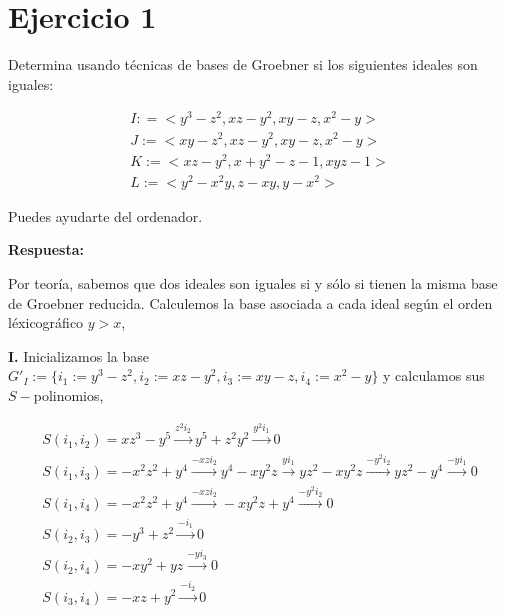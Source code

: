 \documentclass{article}
\begin{document}
    
    \section{Ejercicio 1}\label{ejercicio-1}

Determina usando técnicas de bases de Groebner si los siguientes ideales
son iguales:

\begin{equation}
    \begin{array}{l}
        I : = < y^3 - z^2, xz - y^2, xy - z, x^2 -y > \\
        J := < xy - z^2, xz - y^2, xy - z, x^2 - y >\\
        K := < xz - y^2, x + y^2 -z - 1, xyz - 1 >\\
        L:= < y^2 - x^2y, z -xy, y - x^2 >
    \end{array}
\end{equation}

Puedes ayudarte del ordenador. ~ ~

\bigskip

    \textbf{Respuesta:} ~

\smallskip

    Por teoría, sabemos que dos ideales son iguales si y sólo si tienen la
misma base de Groebner reducida. Calculemos la base asociada a cada
ideal según el orden léxicográfico $y > x$, ~

\bigskip

    \textbf{I.} Inicializamos la base
$G'_I:=\{ i_1:= y^3 - z^2, i_2:=xz - y^2, i_3:=xy - z, i_4:=x^2-y \}$ y
calculamos sus $S-$polinomios,

\begin{equation}
    \begin{array}{l}
    S(i_1, i_2) = xz^3 - y^5 \xrightarrow{z^2 i_2} y^5 + z^2y^2 \xrightarrow{y^2 i_1} 0\\
    S(i_1, i_3) = -x^2z^2 + y^4 \xrightarrow{-xz i_2} y^4 - xy^2z \xrightarrow{y i_1} yz^2 - xy^2z \xrightarrow{-y^2 i_2} yz^2 - y^4 \xrightarrow{-y i_1} 0\\
    S(i_1, i_4) = -x^2z^2 + y^4 \xrightarrow{-xz i_2} -xy^2z + y^4 \xrightarrow{-y^2 i_2} 0\\
    S(i_2, i_3) = -y^3 + z^2 \xrightarrow{-i_1} 0\\
    S(i_2, i_4) = -xy^2 + yz \xrightarrow{-y i_3} 0\\
    S(i_3, i_4) = -xz + y^2 \xrightarrow{-i_2} 0
    \end{array}
\end{equation}
\end{document}
